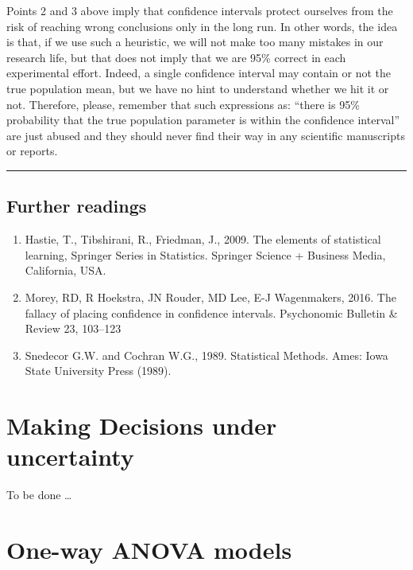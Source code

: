 \documentclass[a4paper,12pt,oneside]{book}
\providecommand{\tightlist}{%
  \setlength{\itemsep}{0pt}\setlength{\parskip}{0pt}}
\begin{document}
Points 2 and 3 above imply that confidence intervals protect ourselves from the risk of reaching wrong conclusions only in the long run. In other words, the idea is that, if we use such a heuristic, we will not make too many mistakes in our research life, but that does not imply that we are 95\% correct in each experimental effort. Indeed, a single confidence interval may contain or not the true population mean, but we have no hint to understand whether we hit it or not. Therefore, please, remember that such expressions as: ``there is 95\% probability that the true population parameter is within the confidence interval'' are just abused and they should never find their way in any scientific manuscripts or reports.

\begin{center}\rule{0.5\linewidth}{0.5pt}\end{center}

\hypertarget{further-readings-3}{%
\section{Further readings}\label{further-readings-3}}

\begin{enumerate}
\def\labelenumi{\arabic{enumi}.}
\tightlist
\item
  Hastie, T., Tibshirani, R., Friedman, J., 2009. The elements of statistical learning, Springer Series in Statistics. Springer Science + Business Media, California, USA.
\item
  Morey, RD, R Hoekstra, JN Rouder, MD Lee, E-J Wagenmakers, 2016. The fallacy of placing confidence in confidence intervals. Psychonomic Bulletin \& Review 23, 103--123
\item
  Snedecor G.W. and Cochran W.G., 1989. Statistical Methods. Ames: Iowa State University Press (1989).
\end{enumerate}

\hypertarget{making-decisions-under-uncertainty}{%
\chapter{Making Decisions under uncertainty}\label{making-decisions-under-uncertainty}}

To be done \ldots{}

\hypertarget{one-way-anova-models}{%
\chapter{One-way ANOVA models}\label{one-way-anova-models}}
\end{document}
